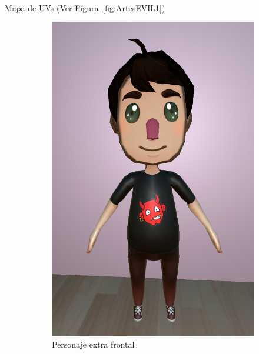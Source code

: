 \documentclass[12pt, a4paper,twoside,titlepage]{book}
\begin{document}
 Mapa de UVs (Ver Figura~\ref{fig:ArtesEVIL1})
 
 \begin{figure}[tb]
\centering
\begin{subfigure}{.5\textwidth}
  \centering
  \includegraphics[width=.95\linewidth]{TGF/Artes/EVIL_front.png}
  \caption{Personaje extra frontal}
\end{subfigure}%
\begin{subfigure}{.5\textwidth}
  \centering

\end{subfigure}
\end{figure}
\end{document}
